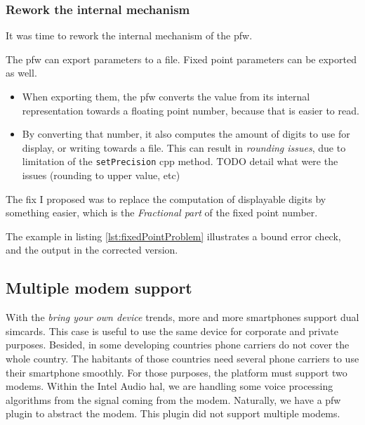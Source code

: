 \subsubsection{Rework the internal mechanism}
It was time to rework the internal
mechanism of the \gls{pfw}.

The \gls{pfw} can export parameters to a file. Fixed
point parameters can be exported as well.
\begin{itemize}
    \item When exporting them, the \gls{pfw} converts the value from
        its internal representation towards a floating point number, because that is
        easier to read.
    \item By converting that number, it also computes the amount of digits
        to use for display, or writing towards a file. This can result in
        \emph{rounding issues}, due to limitation of the \lstinline{setPrecision} \gls{cpp} method.
        TODO detail what were the issues (rounding to upper value, etc)
\end{itemize}
The fix I proposed was to replace the computation of displayable digits by something
easier, which is the \emph{Fractional part} of the fixed point number.

The example in listing \ref {lst:fixedPointProblem} illustrates a bound error check, and the output in the corrected version.



\subsection{Multiple modem support}
With the \emph{bring your own device} trends, more and more smartphones support dual simcards. This case
is useful to use the same device for corporate and private purposes.
Besided, in some developing countries phone carriers do not cover the whole country. The habitants of those
countries need several phone carriers to use their smartphone smoothly.
For those purposes, the platform must support two modems.
Within the Intel Audio \gls{hal}, we are handling some voice processing algorithms from the signal coming from the modem.
Naturally, we have a \gls{pfw} plugin to abstract the modem. This plugin did not support multiple modems.

